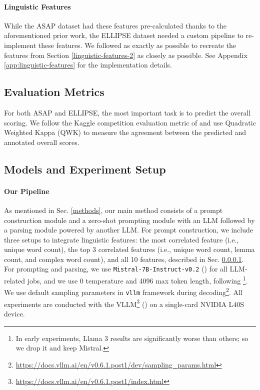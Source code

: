 \paragraph{Linguistic Features}
\label{linguistic-features}

While the ASAP dataset had these features pre-calculated thanks to the aforementioned prior work, the ELLIPSE dataset needed a custom pipeline to re-implement these features. We followed \cite{ridleyAutomatedCrosspromptScoring2021} as exactly as possible to recreate the features from Section \ref{linguistic-features-2} as closely as possible. See Appendix \ref{app:linguistic-features} for the implementation details.

\subsection{Evaluation Metrics}
For both ASAP and ELLIPSE, the most important task is to predict the overall scoring. We follow the Kaggle competition evaluation metric of \cite{asap-aes} and use Quadratic Weighted Kappa (QWK) to measure the agreement between the predicted and annotated overall scores.


\subsection{Models and Experiment Setup}
\label{models-and-experiment-setup}

\paragraph{Our Pipeline}
\label{our-pipeline-(Mistral7B)}
As mentioned in Sec. \ref{methods}, our main method consists of a prompt construction module and a zero-shot prompting module with an LLM followed by a parsing module powered by another LLM. For prompt construction, we include three setups to integrate linguistic features: the most correlated feature (i.e., unique word count), the top 3 correlated features (i.e., unique word count, lemma count, and complex word count), and all 10 features, described in Sec. \ref{linguistic-features}. For prompting and parsing, we use \texttt{Mistral-7B-Instruct-v0.2} (\cite{jiang2023mistral7b}) for all LLM-related jobs, and we use 0 temperature and 4096 max token length, following \cite{stahl-etal-2024-exploring}\footnote{In early experiments, Llama 3 results are significantly worse than others; so we drop it and keep Mistral.}. We use default sampling parameters in \texttt{vllm} framework during decoding\footnote{\url{https://docs.vllm.ai/en/v0.6.1.post1/dev/sampling_params.html}}. All experiments are conducted with the VLLM\footnote{\url{https://docs.vllm.ai/en/v0.6.1.post1/index.html}} (\cite{kwon2023efficient}) on a single-card NVIDIA L40S device. 

